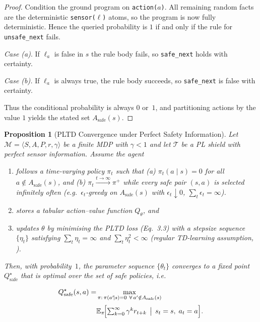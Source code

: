 \documentclass{ecai}
\theoremstyle{plain}
\newtheorem{proposition}[theorem]{Proposition}
\theoremstyle{definition}
\theoremstyle{remark}
\begin{document}
\begin{proof}
Condition the ground program on \texttt{action($a$)}. All remaining random facts are the deterministic \texttt{sensor($\ell$)} atoms, so the program is now fully deterministic. Hence the queried probability is $1$ if and only if the rule for \texttt{unsafe\_next} fails.

\smallskip\noindent
\textit{Case (a)}.
If $\ell_a$ is false in $s$ the rule body fails, so  \texttt{safe\_next} holds with certainty.

\smallskip\noindent
\textit{Case (b).}  
If $\ell_a$ is always true, the rule body succeeds, so \texttt{safe\_next} is false with certainty.

Thus the conditional probability is always $0$ or~$1$, and partitioning actions by the value $1$ yields the stated set $A_{\mathrm{safe}}(s)$.
\end{proof}

\begin{proposition}[PLTD Convergence under Perfect Safety Information]
Let $\mathcal{M}= \langle S,A,P,r,\gamma\rangle$ be a finite MDP with $\gamma<1$ and let $\mathcal{T}$ be a PL shield with perfect sensor information. Assume the agent
\begin{enumerate}
  \item[i.] [GLIE] follows a time-varying policy $\pi_t$ such that (a) $\pi_t(a\mid s)=0$ for all $a\notin A_{\text{safe}}(s)$, and (b) $\pi_t\xrightarrow{t\to\infty}\pi^{+}$ while every safe pair $(s,a)$ is selected infinitely often (e.g.\ $\epsilon_t$-greedy on $A_{\text{safe}}(s)$ with $\epsilon_t\!\downarrow0$, $\sum_t \epsilon_t=\infty$).
  \item[ii.] stores a \emph{tabular} action–value function $Q_\theta$, and
  \item[iii.] updates $\theta$ by minimising the PLTD loss (Eq.~3.3) with a stepsize sequence $\{\eta_t\}$ satisfying $\sum_t\eta_t = \infty$ and $\sum_t\eta_t^{2} < \infty$ (regular TD-learning assumption, \citet{sutton2018reinforcement}).
\end{enumerate}

Then, with probability~$1$, the parameter sequence $\{\theta_t\}$ converges to a fixed point $Q^{\star}_{\mathrm{safe}}$ that is optimal over the set of safe policies, i.e.
\begin{small}
\begin{equation}
\begin{aligned}
  Q^{\star}_{\mathrm{safe}}(s,a)=
  &\max_{\pi:\,\pi(a'\!\mid s)=0\ \forall\,a'\notin A_{\mathrm{safe}}(s)}
\\[2pt]
  &\mathbb{E}_{\pi}\!\Bigl[\textstyle\sum_{k=0}^{\infty}
      \gamma^{k} r_{t+k}\,\bigm|\,s_t=s,\; a_t=a\Bigr].
\end{aligned}
\end{equation}
\end{small}
\end{proposition}
\end{document}
